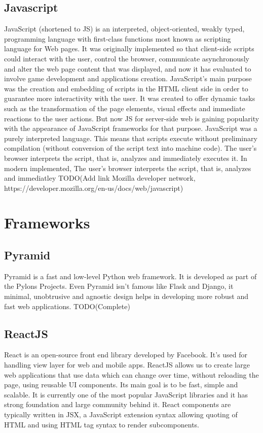 \subsection{Javascript}
JavaScript (shortened to JS) is an interpreted, object-oriented, weakly typed,
programming language with first-class functions most known as scripting language
for Web pages. It was originally implemented so that client-side scripts could
interact with the user, control the browser, communicate asynchronously and
alter the web page content that was displayed, and now it has evaluated to
involve game  development and applications creation. JavaScript's main purpose
was the creation and embedding of scripts in the HTML client side in order to
guarantee more interactivity with the user. It was created to offer dynamic
tasks such as the transformation of the page elements, visual effects and
immediate reactions to the user actions. But now JS for server-side web is
gaining popularity with the appearance of JavaScript frameworks for that
purpose. 
JavaScript was a purely interpreted language. This means that scripts execute
without preliminary compilation (without conversion of the script text into
machine code). The user's browser interprets the script, that is, analyzes and
immediately executes it. In modern implemented, The user's browser interprets
the script, that is, analyzes and immediatley 
TODO(Add link Mozilla developer network, https://developer.mozilla.org/en-us/docs/web/javascript)

\section{Frameworks}
\subsection{Pyramid}
Pyramid is a fast and low-level Python web framework. It is developed as
part of the Pylons Projects. Even Pyramid isn't famous like Flask and Django, it
minimal, unobtrusive and agnostic design helps in developing more robust and
fast web applications. TODO(Complete) 

\subsection{ReactJS}
React is an open-source front end library developed by Facebook. It's used for
handling view layer for web and mobile apps. ReactJS allows us to create large
web applications that use data which can change over time, without reloading the
page, using reusable UI components. Its main goal is to be fast, simple and
scalable. It is currently one of the most popular JavaScript libraries and it
has strong foundation and large community behind it. React components are
typically written in JSX, a JavaScript extension syntax allowing quoting of HTML
and using HTML tag syntax to render subcomponents.

